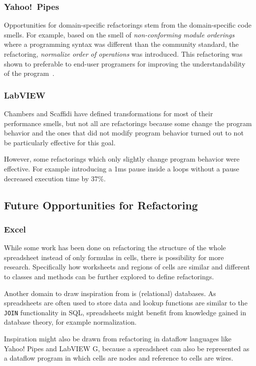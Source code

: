 \documentclass[10pt,conference,compsocconf]{IEEEtran}
\begin{document}
\subsubsection{Yahoo!\ Pipes}
Opportunities for domain-specific refactorings stem from the domain-specific code smells. 
For example, based on the smell of \emph{non-conforming module orderings} where a programming syntax was different than the community standard, the refactoring, \emph{normalize order of operations} was introduced. This refactoring was shown to preferable to end-user programers for improving the understandability of the program~\cite{StoleeTSE2013}. 

\subsubsection{LabVIEW}

Chambers and Scaffidi \cite{chambers2015impact} have defined transformations for most of their performance smells, but not all are refactorings because some change the program behavior and the ones that did not modify program behavior turned out to not be particularly effective for this goal.

However, some refactorings which only slightly change program behavior were effective. For example introducing a 1ms pause inside a loops without a pause decreased execution time by 37\%.

\subsection{Future Opportunities for Refactoring}
\subsubsection{Excel}

While some work has been done on refactoring the structure of the whole spreadsheet instead of only formulas in cells, there is possibility for more research. 
Specifically how worksheets and regions of cells are similar and different to classes and methods can be further explored to define refactorings.

Another domain to draw inspiration from is (relational) databases.
As spreadsheets are often used to store data and lookup functions are similar to the \texttt{JOIN} functionality in SQL, spreadsheets might benefit from knowledge gained in database theory, for example normalization.

Inspiration might also be drawn from refactoring in dataflow languages like Yahoo! Pipes and LabVIEW G, because a spreadsheet can also be represented as a dataflow program in which cells are nodes and reference to cells are wires.
\end{document}
